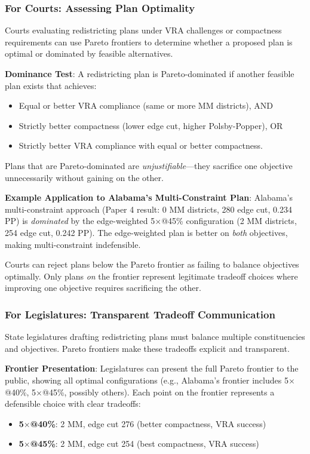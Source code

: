 \subsubsection{For Courts: Assessing Plan Optimality}

Courts evaluating redistricting plans under VRA challenges or compactness requirements can use Pareto frontiers to determine whether a proposed plan is optimal or dominated by feasible alternatives.

\textbf{Dominance Test}: A redistricting plan is Pareto-dominated if another feasible plan exists that achieves:
\begin{itemize}
    \item Equal or better VRA compliance (same or more MM districts), AND
    \item Strictly better compactness (lower edge cut, higher Polsby-Popper), OR
    \item Strictly better VRA compliance with equal or better compactness.
\end{itemize}

Plans that are Pareto-dominated are \emph{unjustifiable}---they sacrifice one objective unnecessarily without gaining on the other.

\textbf{Example Application to Alabama's Multi-Constraint Plan}: Alabama's multi-constraint approach (Paper 4 result: 0 MM districts, 280 edge cut, 0.234 PP) is \emph{dominated} by the edge-weighted 5$\times$@45\% configuration (2 MM districts, 254 edge cut, 0.242 PP). The edge-weighted plan is better on \emph{both} objectives, making multi-constraint indefensible.

Courts can reject plans below the Pareto frontier as failing to balance objectives optimally. Only plans \emph{on} the frontier represent legitimate tradeoff choices where improving one objective requires sacrificing the other.

\subsubsection{For Legislatures: Transparent Tradeoff Communication}

State legislatures drafting redistricting plans must balance multiple constituencies and objectives. Pareto frontiers make these tradeoffs explicit and transparent.

\textbf{Frontier Presentation}: Legislatures can present the full Pareto frontier to the public, showing all optimal configurations (e.g., Alabama's frontier includes 5$\times$@40\%, 5$\times$@45\%, possibly others). Each point on the frontier represents a defensible choice with clear tradeoffs:
\begin{itemize}
    \item \textbf{5$\times$@40\%}: 2 MM, edge cut 276 (better compactness, VRA success)
    \item \textbf{5$\times$@45\%}: 2 MM, edge cut 254 (best compactness, VRA success)
\end{itemize}

